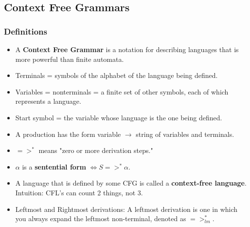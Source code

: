 \subsection{\color{ForestGreen}Context Free Grammars}
\subsubsection{Definitions}
\begin{itemize}
    \item A \textbf{Context Free Grammar} is a notation for describing languages that is more powerful than finite automata.
    \item Terminals = symbols of the alphabet of the language being defined.
    \item Variables = nonterminals = a finite set of other symbols, each of which represents a language.
    \item Start symbol = the variable whose language is the one being defined.
    \item A production has the form variable $\rightarrow{}$ string of variables and terminals.
    \item $=>^* $ means "zero or more derivation steps."
    \item $\alpha$ is a \textbf{sentential form} $\iff S =>^* \alpha.$ 
    \item A language that is defined by some CFG is called a \textbf{context-free language}. Intuition: CFL's can count 2 things, not 3.
    \item Leftmost and Rightmost derivations: A leftmost derivation is one in which you always expand the leftmost non-terminal, denoted as $=>_{lm}^*$.
\end{itemize}
